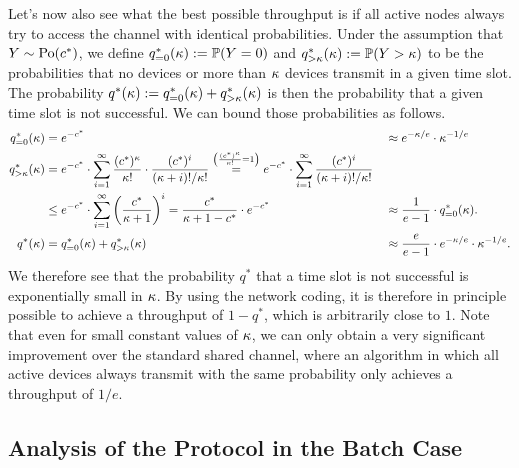 Let's now also see what the best possible throughput is if all active nodes always try to access the channel with identical probabilities. Under the assumption that $Y\sim\mathrm{Po}(c^*)$, we define $q^*_{=0}(\kappa):=\mathbb{P}(Y=0)$ and $q^*_{>\kappa}(\kappa):=\mathbb{P}(Y>\kappa)$ to be the probabilities that no devices or more than $\kappa$ devices transmit in a given time slot. The probability $q^*(\kappa):=q^*_{=0}(\kappa)+q^*_{>\kappa}(\kappa)$ is then the probability that a given time slot is not successful. We can bound those probabilities as follows.
\begin{align}
    q^*_{=0}(\kappa) & = e^{-c^*} &&\approx e^{-\kappa/e}\cdot \kappa^{-1/e}\label{eq:PoissonLowerProb}\\
    q^*_{>\kappa}(\kappa) & =  e^{-c^*} \cdot
    \sum_{i=1}^\infty \frac{(c^*)^\kappa}{\kappa!}\cdot \frac{(c^*)^i}{(\kappa+i)!/\kappa!}
    \stackrel{\left(\frac{(c^*)^\kappa}{\kappa!}=1\right)}{=} e^{-c^*} \cdot
    \sum_{i=1}^\infty \frac{(c^*)^i}{(\kappa+i)!/\kappa!}&&\nonumber\\
    & \leq  e^{-c^*}\cdot \sum_{i=1}^\infty \left(\frac{c^*}{\kappa+1}\right)^i 
     =  \frac{c^*}{\kappa+1-c^*}\cdot e^{-c^*}
    && \approx \frac{1}{e-1}\cdot q^*_{=0}(\kappa).
    \label{eq:PoissonUpperProb}\\
    q^*(\kappa) & = q_{=0}^*(\kappa) + q_{>\kappa}^*(\kappa) && \approx \frac{e}{e-1}\cdot e^{-\kappa/e}\cdot \kappa^{-1/e}.
    \label{eq:PoissonFailureProb}
\end{align}
We therefore see that the probability $q^*$ that a time slot is not successful is exponentially small in $\kappa$. By using the network coding, it is therefore in principle possible to achieve a throughput of $1-q^*$, which is arbitrarily close to $1$. Note that even for small constant values of $\kappa$, we can only obtain a very significant improvement over the standard shared channel, where an algorithm in which all active devices always transmit with the same probability only achieves a throughput of $1/e$.

\subsection{Analysis of the Protocol in the Batch Case}
\label{sec:batchanalysis}

